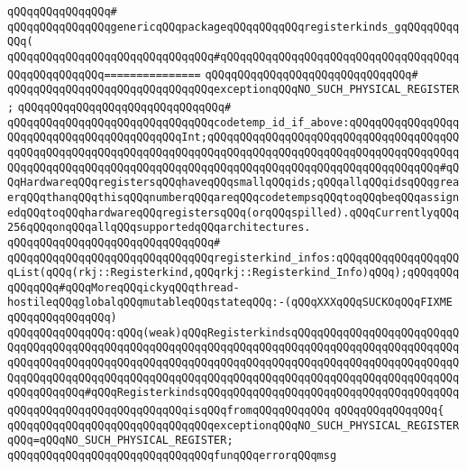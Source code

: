\verb|qQQqqQQqqQQqqQQq#|\newline
\verb|qQQqqQQqqQQqqQQqgenericqQQqpackageqQQqqQQqqQQqregisterkinds_gqQQqqQQqqQQq(|\newline
\verb|qQQqqQQqqQQqqQQqqQQqqQQqqQQqqQQq#qQQqqQQqqQQqqQQqqQQqqQQqqQQqqQQqqQQqqQQqqQQqqQQqqQQq===============|\newline
\verb|qQQqqQQqqQQqqQQqqQQqqQQqqQQqqQQq#|\newline
\verb|qQQqqQQqqQQqqQQqqQQqqQQqqQQqqQQqexceptionqQQqNO_SUCH_PHYSICAL_REGISTER;|\newline
\verb|qQQqqQQqqQQqqQQqqQQqqQQqqQQqqQQq#|\newline
\verb|qQQqqQQqqQQqqQQqqQQqqQQqqQQqqQQqcodetemp_id_if_above:qQQqqQQqqQQqqQQqqQQqqQQqqQQqqQQqqQQqqQQqqQQqInt;qQQqqQQqqQQqqQQqqQQqqQQqqQQqqQQqqQQqqQQqqQQqqQQqqQQqqQQqqQQqqQQqqQQqqQQqqQQqqQQqqQQqqQQqqQQqqQQqqQQqqQQqqQQqqQQqqQQqqQQqqQQqqQQqqQQqqQQqqQQqqQQqqQQqqQQqqQQqqQQqqQQqqQQqqQQqqQQq#qQQqHardwareqQQqregistersqQQqhaveqQQqsmallqQQqids;qQQqallqQQqidsqQQqgreaerqQQqthanqQQqthisqQQqnumberqQQqareqQQqcodetempsqQQqtoqQQqbeqQQqassignedqQQqtoqQQqhardwareqQQqregistersqQQq(orqQQqspilled).qQQqCurrentlyqQQq256qQQqonqQQqallqQQqsupportedqQQqarchitectures.|\newline
\verb|qQQqqQQqqQQqqQQqqQQqqQQqqQQqqQQq#|\newline
\verb|qQQqqQQqqQQqqQQqqQQqqQQqqQQqqQQqregisterkind_infos:qQQqqQQqqQQqqQQqqQQqList(qQQq(rkj::Registerkind,qQQqrkj::Registerkind_Info)qQQq);qQQqqQQqqQQqqQQq#qQQqMoreqQQqickyqQQqthread-hostileqQQqglobalqQQqmutableqQQqstateqQQq:-(qQQqXXXqQQqSUCKOqQQqFIXME|\newline
\verb|qQQqqQQqqQQqqQQq)|\newline
\verb|qQQqqQQqqQQqqQQq:qQQq(weak)qQQqRegisterkindsqQQqqQQqqQQqqQQqqQQqqQQqqQQqqQQqqQQqqQQqqQQqqQQqqQQqqQQqqQQqqQQqqQQqqQQqqQQqqQQqqQQqqQQqqQQqqQQqqQQqqQQqqQQqqQQqqQQqqQQqqQQqqQQqqQQqqQQqqQQqqQQqqQQqqQQqqQQqqQQqqQQqqQQqqQQqqQQqqQQqqQQqqQQqqQQqqQQqqQQqqQQqqQQqqQQqqQQqqQQqqQQqqQQqqQQqqQQqqQQqqQQqqQQq#qQQqRegisterkindsqQQqqQQqqQQqqQQqqQQqqQQqqQQqqQQqqQQqqQQqqQQqqQQqqQQqqQQqqQQqqQQqqQQqisqQQqfromqQQqqQQqqQQq|\newline
\verb|qQQqqQQqqQQqqQQq{|\newline
\verb|qQQqqQQqqQQqqQQqqQQqqQQqqQQqqQQqexceptionqQQqNO_SUCH_PHYSICAL_REGISTERqQQq=qQQqNO_SUCH_PHYSICAL_REGISTER;|\newline
\newline
\verb|qQQqqQQqqQQqqQQqqQQqqQQqqQQqqQQqfunqQQqerrorqQQqmsg|\newline
